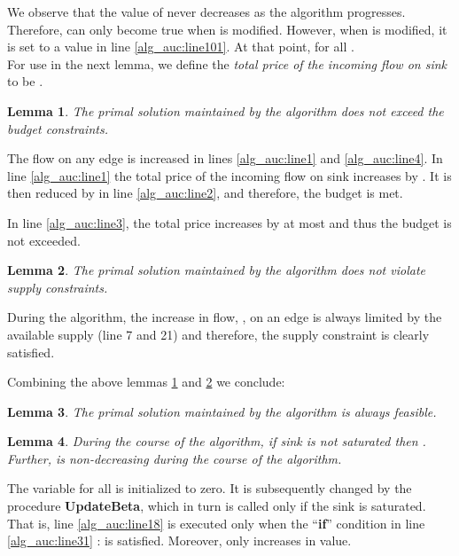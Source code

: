 \documentclass[11pt]{article}
\newenvironment{proof}{\par\noindent{\bf Proof:}}{\mbox{}\hfill\\}
\newtheorem{lemma}{Lemma}[section]
\newcounter{rem}
\begin{document}
\begin{proof}
We observe that the value of  never decreases as the algorithm 
progresses. Therefore,  can only 
become true when  is modified. However, when  is modified, 
it is set to a value  in line \ref{alg_auc:line101}. 
At that point,  for all . 
\end{proof} 
For use in  the next lemma, we define 
the  {\em total price of the incoming flow on sink } to be 
.

\begin{lemma}
The primal solution maintained by the algorithm 
does not exceed the budget constraints. 
\label{primal_feasible1}
\end{lemma}
\begin{proof}
The flow on any edge is increased in lines \ref{alg_auc:line1} and 
\ref{alg_auc:line4}. In line \ref{alg_auc:line1} 
the total price of the incoming flow on sink  increases by . 
It is then reduced by  in line 
\ref{alg_auc:line2}, and therefore, the budget is met. 

In line \ref{alg_auc:line3}, the total price increases by at most 
 and thus the budget is not exceeded.
\end{proof}


\begin{lemma}
The primal solution maintained by the algorithm
 does not violate supply constraints.
\label{primal_feasible2}
\end{lemma}
\begin{proof}
During the algorithm, the increase  in flow, , on an edge  
is always limited by the available supply (line 7 and 21) and
therefore, the supply constraint is clearly satisfied. 
\end{proof}

Combining the above lemmas \ref{primal_feasible1} and \ref{primal_feasible2} 
we conclude:

\begin{lemma}
The primal solution maintained by the algorithm is always feasible.
\end{lemma}









\begin{lemma}
\label{beta-change}
During the course of the algorithm, if sink  is not saturated 
then . Further,  is non-decreasing during the
course of the algorithm.
\end{lemma}
\begin{proof}
The variable  for all   is initialized to zero. It is
subsequently changed by the procedure {\bf UpdateBeta}, which in turn is called only
if the sink  is saturated. That is, line \ref{alg_auc:line18} is executed only when the
``{\bf if}'' condition in line \ref{alg_auc:line31} :  is 
satisfied. Moreover,   only increases in value.
\end{proof}
\end{document}
